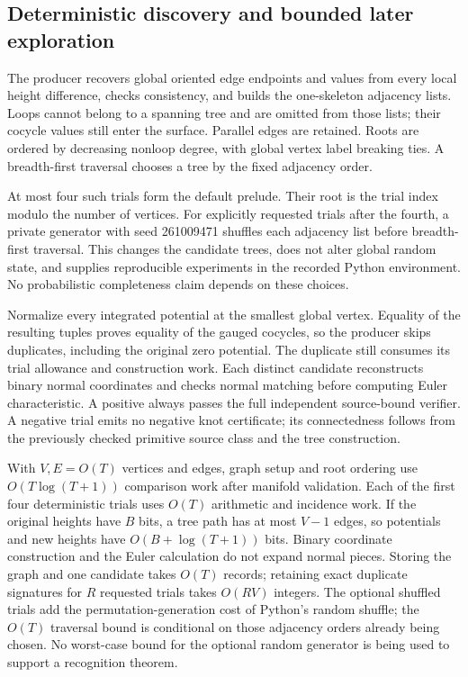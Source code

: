 \subsection{Deterministic discovery and bounded later exploration}

The producer recovers global oriented edge endpoints and values from every
local height difference, checks consistency, and builds the one-skeleton
adjacency lists. Loops cannot belong to a spanning tree and are omitted
from those lists; their cocycle values still enter the surface. Parallel
edges are retained. Roots are ordered by decreasing nonloop degree, with
global vertex label breaking ties. A breadth-first traversal chooses a
tree by the fixed adjacency order.

At most four such trials form the default prelude. Their root is the trial
index modulo the number of vertices. For explicitly requested trials after
the fourth, a private generator with seed 261009471 shuffles each adjacency
list before breadth-first traversal. This changes the candidate trees,
does not alter global random state, and supplies reproducible experiments
in the recorded Python environment. No probabilistic completeness claim
depends on these choices.

Normalize every integrated potential at the smallest global vertex.
Equality of the resulting tuples proves equality of the gauged cocycles,
so the producer skips duplicates, including the original zero potential.
The duplicate still consumes its trial allowance and construction work.
Each distinct candidate reconstructs binary normal coordinates and checks
normal matching before computing Euler characteristic. A positive always
passes the full independent source-bound verifier. A negative trial emits
no negative knot certificate; its connectedness follows from the previously
checked primitive source class and the tree construction.

With $V,E=O(T)$ vertices and edges, graph setup and root ordering use
$O(T\log(T+1))$ comparison work after manifold validation. Each of the
first four deterministic trials uses $O(T)$ arithmetic and incidence work.
If the original heights have $B$ bits, a tree path has at most $V-1$ edges,
so potentials and new heights have $O(B+\log(T+1))$ bits. Binary coordinate
construction and the Euler calculation do not expand normal pieces.
Storing the graph and one candidate takes $O(T)$ records; retaining exact
duplicate signatures for $R$ requested trials takes $O(RV)$ integers.
The optional shuffled trials add the permutation-generation cost of
Python's random shuffle; the $O(T)$ traversal bound is conditional on those
adjacency orders already being chosen. No worst-case bound for the
optional random generator is being used to support a recognition theorem.

